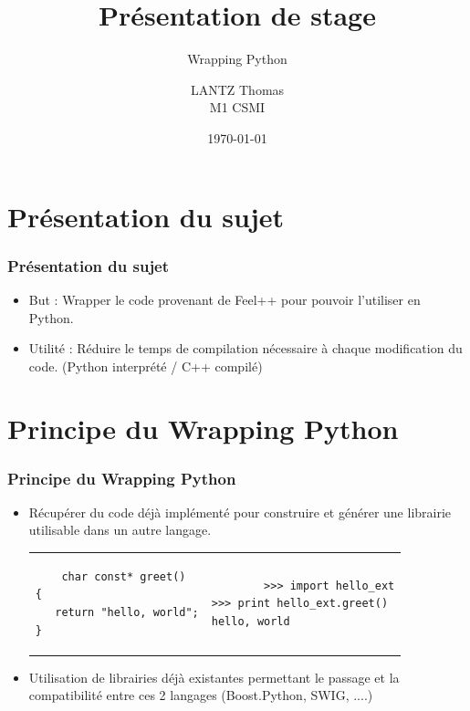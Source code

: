 \documentclass[french,10pt]{beamer}
\date{}
\title{Présentation de stage}
\subtitle{Wrapping Python}
\author{LANTZ Thomas\\
		M1 CSMI}
\institute{UFR de Mathématiques et d'Informatique de Strasbourg}
\date{\today}
\begin{document}
\frame{\titlepage}

\begin{frame}
\tableofcontents
\end{frame}

\section{Présentation du sujet}
\begin{frame}
\frametitle{Présentation du sujet}
\begin{itemize}
\item But : Wrapper le code provenant de Feel++ pour pouvoir l'utiliser en Python.
\vspace{1 cm}
\item Utilité : Réduire le temps de compilation nécessaire à chaque modification du code.
(Python interprété / C++ compilé)
\end{itemize}
\end{frame}

\section{Principe du Wrapping Python}
\begin{frame}[fragile]
\frametitle{Principe du Wrapping Python}
\begin{itemize}
\item Récupérer du code déjà implémenté pour construire et générer une librairie utilisable dans un autre langage.
\begin{tabular}{p{5cm}p{6cm}}
    			\begin{small}\begin{lstlisting}
	char const* greet()
{
   return "hello, world";
}
\end{lstlisting}\end{small}
			&    
\begin{small}		
\begin{lstlisting}
		>>> import hello_ext
>>> print hello_ext.greet()
hello, world
\end{lstlisting}
\end{small}
    \end{tabular}
\item Utilisation de librairies déjà existantes permettant le passage et la compatibilité entre ces 2 langages (Boost.Python, SWIG, ....)

\end{itemize}
\end{frame}
\end{document}
